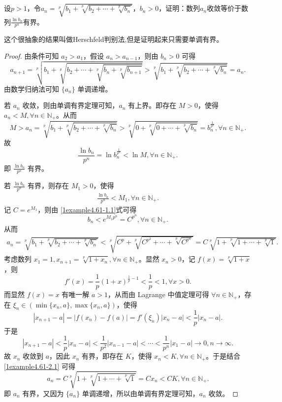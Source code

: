 \documentclass[../../main.tex]{subfiles}
\begin{document}
\begin{example}[$\,\,$Herschfeld判别法]\label{example:Herschfeld判别法}
设\(p > 1\)，令\(a_n=\sqrt[p]{b_1 + \sqrt[p]{b_2+\cdots+\sqrt[p]{b_n}}}\)，\(b_n>0\)，证明：数列\(a_n\)收敛等价于数列\(\frac{\ln b_n}{p^n}\)有界。
\end{example}
\begin{remark}
这个很抽象的结果叫做Herschfeld判别法,但是证明起来只需要单调有界。
\end{remark}
\begin{proof}
由条件可知 \(a_2 > a_1\)，假设 \(a_n > a_{n - 1}\)，则由 \(b_n > 0\) 可得
\[
a_{n + 1}=\sqrt[p]{b_1+\sqrt[p]{b_2+\cdots +\sqrt[p]{b_n+\sqrt[p]{b_{n + 1}}}}}>\sqrt[p]{b_1+\sqrt[p]{b_2+\cdots +\sqrt[p]{b_n}}}=a_n.
\]
由数学归纳法可知 \(\{ a_n \}\) 单调递增。

若 \(a_n\) 收敛，则由单调有界定理可知，\(a_n\) 有上界。即存在 \(M > 0\)，使得 \(a_n < M,\forall n\in \mathbb{N}_+\)。从而
\[
M > a_n=\sqrt[p]{b_1+\sqrt[p]{b_2+\cdots +\sqrt[p]{b_n}}}>\sqrt[p]{0+\sqrt[p]{0+\cdots +\sqrt[p]{b_n}}}=b_n^{\frac{1}{p^n}},\forall n\in \mathbb{N}_+.
\]
故
\[
\frac{\ln b_n}{p^n}=\ln b_n^{\frac{1}{p^n}}<\ln M,\forall n\in \mathbb{N}_+.
\]
即 \(\frac{\ln b_n}{p^n}\) 有界。

若 \(\frac{\ln b_n}{p^n}\) 有界，则存在 \(M_1 > 0\)，使得
\begin{align}
\frac{\ln b_n}{p^n}<M_1,\forall n\in \mathbb{N}_+. \label{1example4.61-1.1}
\end{align}
记 \(C = e^{M_1}\)，则由 \eqref{1example4.61-1.1}式可得
\[
b_n<e^{M_1p^n}=C^{p^n},\forall n\in \mathbb{N}_+.
\]
从而
\begin{align}
a_n=\sqrt[p]{b_1+\sqrt[p]{b_2+\cdots +\sqrt[p]{b_n}}}<\sqrt[p]{C^p+\sqrt[p]{C^{p^2}+\cdots +\sqrt[p]{C^{p^n}}}}=C\sqrt[p]{1+\sqrt[p]{1+\cdots +\sqrt[p]{1}}}. \label{1example4.61-2.1}
\end{align}
考虑数列 \(x_1 = 1,x_{n + 1}=\sqrt[p]{1 + x_n},\forall n\in \mathbb{N}_+\)。显然 \(x_n > 0\)，记 \(f(x)=\sqrt[p]{1 + x}\)，则
\[
f'(x)=\frac{1}{p}(1 + x)^{\frac{1}{p}-1}<\frac{1}{p}<1,\forall x > 0.
\]
而显然 \(f(x)=x\) 有唯一解 \(a > 1\)，从而由 Lagrange 中值定理可得 \(\forall n\in \mathbb{N}_+\)，存在 \(\xi_n\in(\min\{ x_n,a \},\max\{ x_n,a \})\)，使得
\[
|x_{n + 1}-a|=|f(x_n)-f(a)|=f'(\xi_n)|x_n - a|<\frac{1}{p}|x_n - a|.
\]
于是
\[
|x_{n + 1}-a|<\frac{1}{p}|x_n - a|<\frac{1}{p^2}|x_{n - 1}-a|<\cdots <\frac{1}{p^n}|x_1 - a|\rightarrow 0,n\rightarrow\infty.
\]
故 \(x_n\) 收敛到 \(a\)，因此 \(x_n\) 有界，即存在 \(K\)，使得 \(x_n < K,\forall n\in \mathbb{N}_+\)。于是结合 \eqref{1example4.61-2.1} 可得
\[
a_n=C\sqrt[p]{1+\sqrt[p]{1+\cdots +\sqrt[p]{1}}}=Cx_n<CK,\forall n\in \mathbb{N}_+.
\]
即 \(a_n\) 有界，又因为 \(\{ a_n \}\) 单调递增，所以由单调有界定理可知，\(a_n\) 收敛。
\end{proof}
\end{document}
